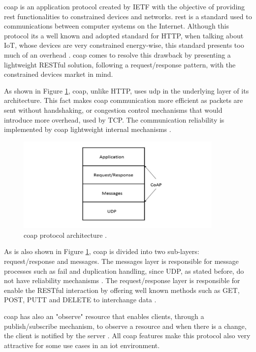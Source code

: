 \acf{coap} is an application protocol created by IETF with the objective of providing \acf{rest} functionalities to constrained devices and networks. \ac{rest} is a standard used to communications between computer systems on the Internet. Although this protocol its a well known and adopted standard for HTTP, when talking about IoT, whose devices are very constrained energy-wise, this standard presents too much of an overhead \cite{Salman2013}. \ac{coap} comes to resolve this drawback by presenting a lightweight RESTful solution, following a request/response pattern, with the constrained devices market in mind.

As shown in Figure \ref{fig:coap}, \ac{coap}, unlike HTTP, uses \ac{udp} in the underlying layer of its architecture. This fact makes \ac{coap} communication more efficient as packets are sent without handshaking, or congestion control mechanisms that would introduce more overhead, used by TCP. The communication reliability is implemented by \ac{coap} lightweight internal mechanisms \cite{Salman2013}.

\begin{figure}[H]
	\centering
	\includegraphics[width=0.9\textwidth]{figures/coap.png}
	\caption{\ac{coap} protocol architecture \cite{Mehboob2016}.}
	\label{fig:coap}
\end{figure}

As is also shown in Figure \ref{fig:coap}, \ac{coap} is divided into two sub-layers: request/response and messages. The messages layer is responsible for message processes such as fail and duplication handling, since UDP, as stated before, do not have reliability mechanisms \cite{Salman2013}. The request/response layer is responsible for enable the RESTful interaction by offering well known methods such as GET, POST, PUTT and DELETE to interchange data \cite{Lerche2012}.

\ac{coap} has also an "observe" resource that enables clients, through a publish/subscribe mechanism, to observe a resource and when there is a change, the client is notified by the server \cite{Lerche2012}. All \ac{coap} features make this protocol also very attractive for some use cases in an \ac{iot} environment.


